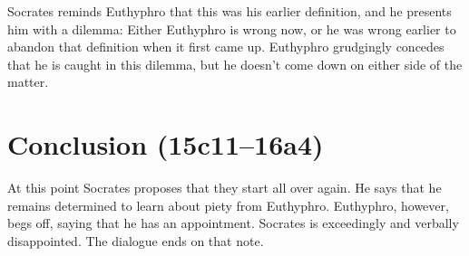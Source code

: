 \documentclass[11pt]{article}
\begin{document}
Socrates reminds Euthyphro that this was his earlier definition, and he
presents him with a dilemma: Either Euthyphro is wrong now, or he was wrong
earlier to abandon that definition when it first came up.  Euthyphro
grudgingly concedes that he is caught in this dilemma, but he doesn't come
down on either side of the matter.

\section{Conclusion (15c11--16a4)}

At this point Socrates proposes that they start all over again.  He says
that he remains determined to learn about piety from Euthyphro.  Euthyphro,
however, begs off, saying that he has an appointment.  Socrates is
exceedingly and verbally disappointed. The dialogue ends on that note.

\newpage


\end{document}
